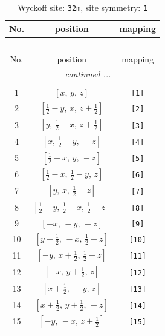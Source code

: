 \documentclass[fleqn,8pt]{jsarticle}
\begin{document}
\renewcommand{\arraystretch}{1.2}
\begin{longtable}{ccc}
\caption{Wyckoff site: {\tt 32m}, site symmetry: {\tt 1}}
 \\
 \hline \hline
No. & position & mapping \\ \hline \endfirsthead

\multicolumn{2}{l}{\tablename\ \thetable{}} \\
 \hline \hline
No. & position & mapping \\ \hline \endhead

 \hline \hline
\multicolumn{2}{r}{\footnotesize\it continued ...} \\ \endfoot

 \hline \hline
\multicolumn{2}{r}{} \\ \endlastfoot

1 & $\left[ x,\, y,\, z \right]$ & {\tt [1]} \\ \hline
2 & $\left[ \frac{1}{2} - y,\, x,\, z + \frac{1}{2} \right]$ & {\tt [2]} \\ \hline
3 & $\left[ y,\, \frac{1}{2} - x,\, z + \frac{1}{2} \right]$ & {\tt [3]} \\ \hline
4 & $\left[ x,\, \frac{1}{2} - y,\, - z \right]$ & {\tt [4]} \\ \hline
5 & $\left[ \frac{1}{2} - x,\, y,\, - z \right]$ & {\tt [5]} \\ \hline
6 & $\left[ \frac{1}{2} - x,\, \frac{1}{2} - y,\, z \right]$ & {\tt [6]} \\ \hline
7 & $\left[ y,\, x,\, \frac{1}{2} - z \right]$ & {\tt [7]} \\ \hline
8 & $\left[ \frac{1}{2} - y,\, \frac{1}{2} - x,\, \frac{1}{2} - z \right]$ & {\tt [8]} \\ \hline
9 & $\left[ - x,\, - y,\, - z \right]$ & {\tt [9]} \\ \hline
10 & $\left[ y + \frac{1}{2},\, - x,\, \frac{1}{2} - z \right]$ & {\tt [10]} \\ \hline
11 & $\left[ - y,\, x + \frac{1}{2},\, \frac{1}{2} - z \right]$ & {\tt [11]} \\ \hline
12 & $\left[ - x,\, y + \frac{1}{2},\, z \right]$ & {\tt [12]} \\ \hline
13 & $\left[ x + \frac{1}{2},\, - y,\, z \right]$ & {\tt [13]} \\ \hline
14 & $\left[ x + \frac{1}{2},\, y + \frac{1}{2},\, - z \right]$ & {\tt [14]} \\ \hline
15 & $\left[ - y,\, - x,\, z + \frac{1}{2} \right]$ & {\tt [15]} \\ \hline

\end{longtable}
\end{document}
